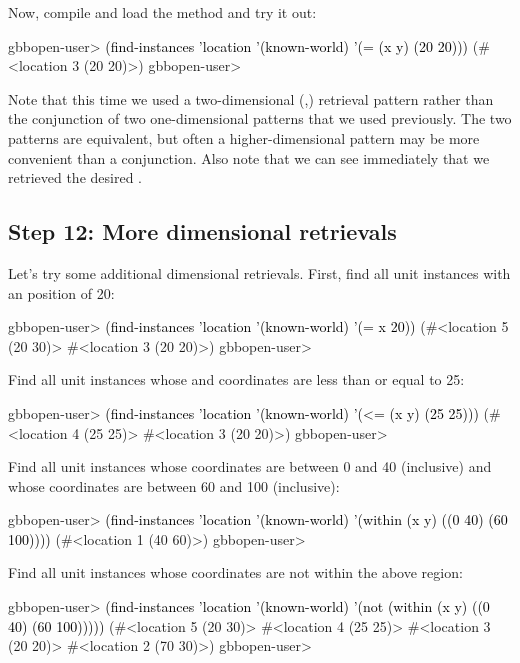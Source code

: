 \documentclass[10pt,twoside,english,pdftex]{article}
\begin{document}
%
%
Now, compile and load the  method and try
it out:
%
\W\supp
\begin{example}
\textcolor{darkergray}{%
  gbbopen-user> \textcolor{black}{(find-instances 'location '(known-world)
                  '(= (x y) (20 20)))}
   (#<location 3 (20 20)>)
  gbbopen-user>}
\end{example}

Note that this time we used a two-dimensional (,) retrieval
pattern rather than the conjunction of two one-dimensional patterns that we
used previously.  The two patterns are equivalent, but often a
higher-dimensional pattern may be more convenient than a conjunction.  Also
note that we can see immediately that we retrieved the desired
.

\subsection*{Step 12: More dimensional retrievals}

%
%
Let's try some additional dimensional retrievals.  First, find all
 unit instances with an  position of 20:
%
\W\supp
\begin{example}
\textcolor{darkergray}{%
  gbbopen-user> \textcolor{black}{(find-instances 'location '(known-world)
                  '(= x 20))}
   (#<location 5 (20 30)> #<location 3 (20 20)>)
  gbbopen-user>}
\end{example}
%
Find all  unit instances whose  and 
coordinates are less than or equal to 25:
%
\W\supp\notpretop
\begin{example}
\textcolor{darkergray}{%
  gbbopen-user> \textcolor{black}{(find-instances 'location '(known-world)
                  '(<= (x y) (25 25)))}
  (#<location 4 (25 25)> #<location 3 (20 20)>)
  gbbopen-user>}
\end{example}
%
Find all  unit instances whose  coordinates are
between 0 and 40 (inclusive) and whose  coordinates are between 60 and
100 (inclusive):
%
\W\supp\notpretop
\begin{example}
\textcolor{darkergray}{%
  gbbopen-user> \textcolor{black}{(find-instances 'location '(known-world)
                  '(within (x y) ((0 40) (60 100))))}
  (#<location 1 (40 60)>)
  gbbopen-user>}
\end{example}
%
Find all  unit instances whose coordinates are not
within the above region:
%
\W\supp\notpretop
\begin{example}
\textcolor{darkergray}{%
  gbbopen-user> \textcolor{black}{(find-instances 'location '(known-world)
                  '(not (within (x y) ((0 40) (60 100)))))}
  (#<location 5 (20 30)> #<location 4 (25 25)> #<location 3 (20 20)>
   #<location 2 (70 30)>)
  gbbopen-user>}
\end{example}
\end{document}
